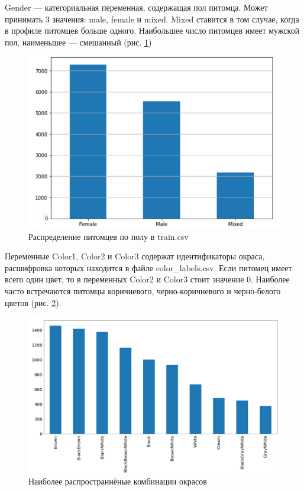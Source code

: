 \documentclass[14pt]{mmcs_article}
\begin{document}
Gender --- категориальная переменная, содержащая пол питомца. Может принимать 3 значения: male, female и mixed. Mixed ставится в том случае, когда в профиле питомцев больше одного. Наибольшее число питомцев имеет мужской пол, наименьшее — смешанный (рис. \ref{analyse:gender})

\begin{figure}[H]
	\centering
	\includegraphics[scale=0.8]{gender.png}
	\caption{Распределение питомцев по полу в train.csv}\label{analyse:gender}
\end{figure}

Переменные Color1, Color2 и Color3 содержат идентификаторы окраса, расшифровка которых находится в файле color\_labels.csv. Если питомец имеет всего один цвет, то в переменных Color2 и Color3 стоит значение 0. Наиболее часто встречаются питомцы коричневого, черно-коричневого и черно-белого цветов (рис. \ref{analyse:color}).

\begin{figure}[H]
	\centering
	\includegraphics[scale=0.5]{color.png}
	\caption{Наиболее распространнёные комбинации окрасов}\label{analyse:color}
\end{figure}
\end{document}
